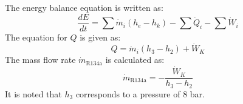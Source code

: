 The energy balance equation is written as:  
\[
\frac{dE}{dt} = \sum \dot{m}_i (h_e - h_k) - \sum \dot{Q}_i - \sum \dot{W}_i
\]  
The equation for \( Q \) is given as:  
\[
Q = \dot{m}_i (h_3 - h_2) + \dot{W}_K
\]  
The mass flow rate \( \dot{m}_{\text{R134a}} \) is calculated as:  
\[
\dot{m}_{\text{R134a}} = -\frac{\dot{W}_K}{h_3 - h_2}
\]  
It is noted that \( h_3 \) corresponds to a pressure of 8 bar.